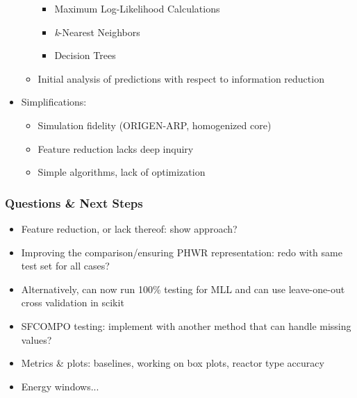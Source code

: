 \begin{frame}
\begin{adjustwidth}{-10pt}{0pt}
\begin{minipage}{0.65\textwidth}
\begin{itemize}
\begin{itemize}
        \begin{itemize}
          \item Maximum Log-Likelihood Calculations
          \item \textit{k}-Nearest Neighbors
          \item Decision Trees
        \end{itemize}
      \item Initial analysis of predictions with respect to information reduction
    \end{itemize}
    \item Simplifications:
    \begin{itemize}
      \item Simulation fidelity (ORIGEN-ARP, homogenized core)
      \item Feature reduction lacks deep inquiry
      \item Simple algorithms, lack of optimization
    \end{itemize}
  \end{itemize}
  \end{minipage}
  \end{adjustwidth}
\end{frame}

\begin{frame}
  \frametitle{Questions \& Next Steps}
  \begin{itemize}
    \item Feature reduction, or lack thereof: show approach?
    \item Improving the comparison/ensuring PHWR representation: redo with same test set for all cases?
    \item Alternatively, can now run 100\% testing for MLL and can use leave-one-out cross validation in scikit
    \item SFCOMPO testing: implement with another method that can handle missing values?
    \item Metrics \& plots: baselines, working on box plots, reactor type accuracy
    \item Energy windows...
  \end{itemize}
\end{frame}

